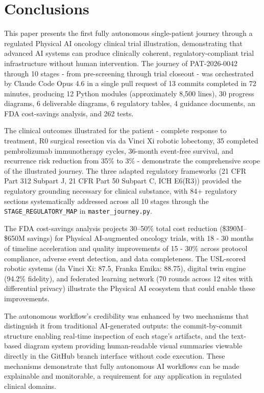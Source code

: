 \section{Conclusions}
\label{sec:conclusions}

This paper presents the first fully autonomous single-patient journey through a regulated Physical AI oncology clinical trial illustration, demonstrating that advanced AI systems can produce clinically coherent, regulatory-compliant trial infrastructure without human intervention. The journey of PAT-2026-0042 through 10 stages - from pre-screening through trial closeout  - was orchestrated by Claude Code Opus 4.6 in a single pull request of 13 commits completed in 72 minutes, producing 12 Python modules (approximately 8,500 lines), 30 progress diagrams, 6 deliverable diagrams, 6 regulatory tables, 4 guidance documents, an FDA cost-savings analysis, and 262 tests.

The clinical outcomes illustrated for the patient - complete response to treatment, R0 surgical resection via da Vinci Xi robotic lobectomy, 35 completed pembrolizumab immunotherapy cycles, 36-month event-free survival, and recurrence risk reduction from 35\% to 3\% - demonstrate the comprehensive scope of the illustrated journey. The three adapted regulatory frameworks (21 CFR Part 312 Subpart J, 21 CFR Part 50 Subpart C, ICH E6(R3)) provided the regulatory grounding necessary for clinical substance, with 84+ regulatory sections systematically addressed across all 10 stages through the \texttt{STAGE\_REGULATORY\_MAP} in \texttt{master\_journey.py}.

The FDA cost-savings analysis projects 30--50\% total cost reduction (\$390M--\$650M savings) for Physical AI-augmented oncology trials, with 18 - 30 months of timeline acceleration and quality improvements of 15 - 30\% across protocol compliance, adverse event detection, and data completeness. The USL-scored robotic systems (da Vinci Xi: 87.5, Franka Emika: 88.75), digital twin engine (94.2\% fidelity), and federated learning network (70 rounds across 12 sites with differential privacy) illustrate the Physical AI ecosystem that could enable these improvements.

The autonomous workflow's credibility was enhanced by two mechanisms that distinguish it from traditional AI-generated outputs: the commit-by-commit structure enabling real-time inspection of each stage's artifacts, and the text-based diagram system providing human-readable visual summaries viewable directly in the GitHub branch interface without code execution. These mechanisms demonstrate that fully autonomous AI workflows can be made explainable and monitorable, a requirement for any application in regulated clinical domains.

